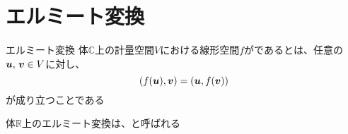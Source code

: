 \documentclass[../../../topic_linear-algebra]{subfiles}
\begin{document}
\sectionline
\section{エルミート変換}

\begin{definition*}{エルミート変換}
  体$\mathbb{C}$上の計量空間$V$における線形空間$f$がであるとは、任意の$\vb*{u},\,\vb*{v} \in V$に対し、
  \begin{equation*}
    (f(\vb*{u}), \vb*{v}) = (\vb*{u}, f(\vb*{v}))
  \end{equation*}
  が成り立つことである
\end{definition*}

体$\mathbb{R}$上のエルミート変換は、と呼ばれる
\end{document}
